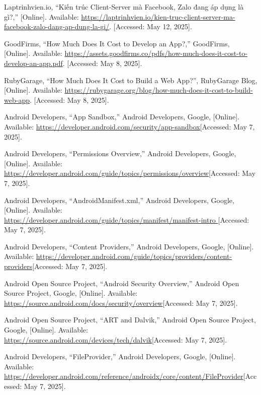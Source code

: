 \documentclass[12pt]{report}
\begin{document}
\begin{thebibliography}{1}
  Laptrinhvien.io, “Kiến trúc Client-Server mà Facebook, Zalo đang áp dụng là gì?,” [Online]. Available: \url{https://laptrinhvien.io/kien-truc-client-server-ma-facebook-zalo-dang-ap-dung-la-gi/}. [Accessed: May 12, 2025].

  GoodFirms, “How Much Does It Cost to Develop an App?,” GoodFirms, [Online]. Available: \url{https://assets.goodfirms.co/pdfs/how-much-does-it-cost-to-develop-an-app.pdf}. [Accessed: May 8, 2025].

  RubyGarage, “How Much Does It Cost to Build a Web App?”, RubyGarage Blog, [Online]. Available: \url{https://rubygarage.org/blog/how-much-does-it-cost-to-build-web-app}. [Accessed: May 8, 2025].
  

  Android Developers, “App Sandbox,” Android Developers, Google, [Online]. Available: \url{https://developer.android.com/security/app-sandbox}[Accessed: May 7, 2025].
  
  Android Developers, “Permissions Overview,” Android Developers, Google, [Online]. Available: \url{https://developer.android.com/guide/topics/permissions/overview}[Accessed: May 7, 2025].
  
  Android Developers, “AndroidManifest.xml,” Android Developers, Google, [Online]. Available: \url{https://developer.android.com/guide/topics/manifest/manifest-intro }[Accessed: May 7, 2025].
   
  Android Developers, “Content Providers,” Android Developers, Google, [Online]. Available: \url{https://developer.android.com/guide/topics/providers/content-providers}[Accessed: May 7, 2025].
  
  Android Open Source Project, “Android Security Overview,” Android Open Source Project, Google, [Online]. Available: \url{https://source.android.com/docs/security/overview}[Accessed: May 7, 2025].
 
  Android Open Source Project, “ART and Dalvik,” Android Open Source Project, Google, [Online]. Available: \url{https://source.android.com/devices/tech/dalvik}[Accessed: May 7, 2025].
 
  Android Developers, “FileProvider,” Android Developers, Google, [Online]. Available: \url{https://developer.android.com/reference/androidx/core/content/FileProvider}[Accessed: May 7, 2025].
 

\end{thebibliography}
\end{document}
